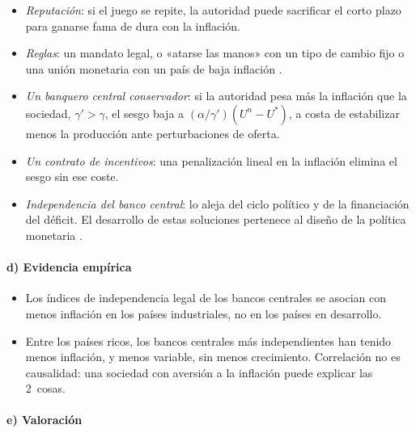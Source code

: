 \documentclass[11pt]{article}
\begin{document}
\begin{itemize}
\item \emph{Reputación}: si el juego se repite, la autoridad puede sacrificar el corto plazo para ganarse fama de dura con la inflación\nocite{BarroGordon1983Rules}.
\item \emph{Reglas}: un mandato legal, o «atarse las manos» con un tipo de cambio fijo o una unión monetaria con un país de baja inflación\nocite{GiavazziPagano1988Advantage} .
\item \emph{Un banquero central conservador}: si la autoridad pesa más la inflación que la sociedad, $\gamma'>\gamma$, el sesgo baja a $(\alpha/\gamma')(U^n-U^*)$, a costa de estabilizar menos la producción ante perturbaciones de oferta\nocite{Rogoff1985Optimal}.
\item \emph{Un contrato de incentivos}: una penalización lineal en la inflación elimina el sesgo sin ese coste\nocite{Walsh1995Optimal}.
\item \emph{Independencia del banco central}: lo aleja del ciclo político y de la financiación del déficit. El desarrollo de estas soluciones pertenece al diseño de la política monetaria .
\end{itemize}

\paragraph{d) Evidencia empírica}

\begin{itemize}
\item Los índices de independencia legal de los bancos centrales se asocian con menos inflación en los países industriales, no en los países en desarrollo\nocite{CukiermanWebbNeyapti1992}.
\item Entre los países ricos, los bancos centrales más independientes han tenido menos inflación, y menos variable, sin menos crecimiento\nocite{AlesinaSummers1993Central}. Correlación no es causalidad: una sociedad con aversión a la inflación puede explicar las 2~cosas.
\end{itemize}

\paragraph{e) Valoración}
\end{document}
